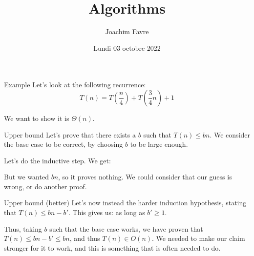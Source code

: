 \documentclass[a4paper]{article}
\title{Algorithms}
\author{Joachim Favre}
\date{Lundi 03 octobre 2022}
\begin{document}
\maketitle


\begin{parag}{Example}
    Let's look at the following recurrence: 
    \[T\left(n\right) = T\left(\frac{n}{4}\right) + T\left(\frac{3}{4}n\right) + 1\]
    
    We want to show it is $\Theta\left(n\right)$.

    \begin{subparag}{Upper bound}
        Let's prove that there exists a $b$ such that $T\left(n\right) \leq bn$. We consider the base case to be correct, by choosing $b$ to be large enough.

        Let's do the inductive step. We get:
        
        But we wanted $bn$, so it proves nothing. We could consider that our guess is wrong, or do another proof.
    \end{subparag}

    \begin{subparag}{Upper bound (better)}
        Let's now instead the harder induction hypothesis, stating that $T\left(n\right) \leq bn - b'$. This gives us:
        as long as $b' \geq 1$. 

        Thus, taking $b$ such that the base case works, we have proven that $T\left(n\right) \leq bn - b' \leq bn$, and thus $T\left(n\right) \in O\left(n\right)$. We needed to make our claim stronger for it to work, and this is something that is often needed to do.
    \end{subparag}
\end{parag}
\end{document}
